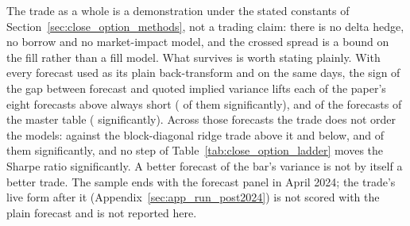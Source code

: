 The trade as a whole is a demonstration under the stated constants of
Section~\ref{sec:close_option_methods}, not a trading claim: there is no delta
hedge, no borrow and no market-impact model, and the crossed spread is a bound
on the fill rather than a fill model. What survives is worth stating plainly.
With every forecast used as its plain back-transform and on the same \cmNdays{} days, the
sign of the gap between forecast and quoted implied variance lifts each of the paper's eight
forecasts above always short (\cmPaperVsShortAboveSigN{} of them significantly), and
\cmMasterVsShortAbove{} of the \cmMasterVsShortN{} forecasts of the master table
(\cmMasterVsShortAboveSig{} significantly). Across those forecasts the trade does not order
the models: against the
block-diagonal ridge \cmMasterVsRefAbove{} trade above it and \cmMasterVsRefBelow{} below,
\cmMasterVsRefAboveSig{} and \cmMasterVsRefBelowSig{} of them significantly, and no step of
Table~\ref{tab:close_option_ladder} moves the Sharpe ratio significantly. A better forecast
of the bar's variance is not by itself a better trade. The sample ends with the
forecast panel in April 2024; the trade's live form after it
(Appendix~\ref{sec:app_run_post2024}) is not scored with the plain forecast and is not
reported here.

